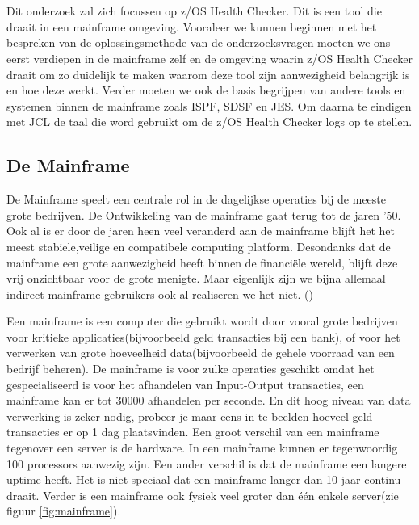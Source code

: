 \chapter{}
\label{ch:stand-van-zaken}



Dit onderzoek zal zich focussen op z/OS Health Checker. Dit is een tool die draait in een mainframe omgeving. Vooraleer we kunnen beginnen met het bespreken van de oplossingsmethode van de onderzoeksvragen moeten we ons eerst verdiepen in de mainframe zelf en de omgeving waarin z/OS Health Checker draait om zo duidelijk te maken waarom deze tool zijn aanwezigheid belangrijk is en hoe deze werkt. Verder moeten we ook de basis begrijpen van andere tools en systemen binnen de mainframe zoals ISPF, SDSF en JES. Om daarna te eindigen met JCL de taal die word gebruikt om de z/OS Health Checker logs op te stellen.

\section{De Mainframe}
\label{sec:De Mainframe}

De Mainframe speelt een centrale rol in de dagelijkse operaties bij de meeste grote bedrijven. De Ontwikkeling van de mainframe gaat terug tot de jaren '50. Ook al is er door de jaren heen veel veranderd aan de mainframe blijft het het meest stabiele,veilige en compatibele computing platform. Desondanks dat de mainframe een grote aanwezigheid heeft binnen de financiële wereld, blijft deze vrij onzichtbaar voor de grote menigte. Maar eigenlijk zijn we bijna allemaal indirect mainframe gebruikers ook al realiseren we het niet. (\cite{Ebbers2011})

Een mainframe is een computer die gebruikt wordt door vooral grote bedrijven voor kritieke applicaties(bijvoorbeeld geld transacties bij een bank), of voor het verwerken van grote hoeveelheid data(bijvoorbeeld de gehele voorraad van een bedrijf beheren). De mainframe is voor zulke operaties geschikt omdat het gespecialiseerd is voor het afhandelen van Input-Output transacties, een mainframe kan er tot 30000 afhandelen per seconde. En dit hoog niveau van data verwerking is zeker nodig, probeer je maar eens in te beelden hoeveel geld transacties er op 1 dag plaatsvinden. Een groot verschil van een mainframe tegenover een server is de hardware. In een mainframe kunnen er tegenwoordig 100 processors aanwezig zijn. Een ander verschil is dat de mainframe een langere uptime heeft. Het is niet speciaal dat een mainframe langer dan 10 jaar continu draait. Verder is een mainframe ook fysiek veel groter dan één enkele server(zie figuur \ref{fig:mainframe}).\cite{Ebbers2011}

